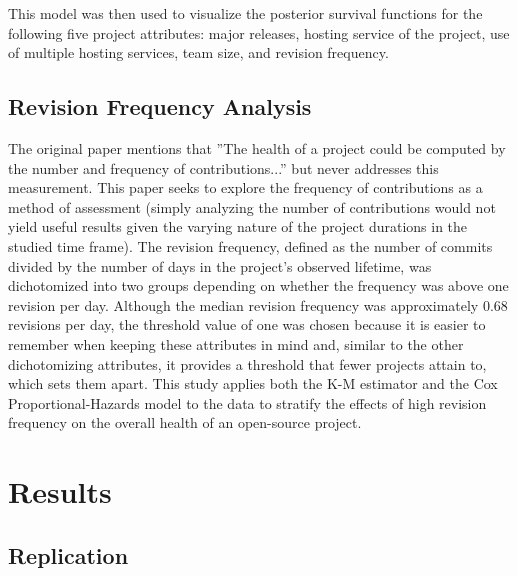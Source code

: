 \documentclass[acmconf]{acmart}
\begin{document}
This model was then used to visualize the posterior survival functions for the following five project attributes: major releases, hosting service of the project, use of multiple hosting services, team size, and revision frequency. 


\subsection{Revision Frequency Analysis} \label{revisionFreq}

The original paper mentions that ''The health of a project could be computed by the number and frequency of contributions...'' but never addresses this measurement.
This paper seeks to explore the frequency of contributions as a method of assessment (simply analyzing the number of contributions would not yield useful results given the varying nature of the project durations in the studied time frame). 
The revision frequency, defined as the number of commits divided by the number of days in the project's observed lifetime, was dichotomized into two groups depending on whether the frequency was above one revision per day.
Although the median revision frequency was approximately 0.68 revisions per day, the threshold value of one was chosen because it is easier to remember when keeping these attributes in mind and, similar to the other dichotomizing attributes, it provides a threshold that fewer projects attain to, which sets them apart.
This study applies both the K-M estimator and the Cox Proportional-Hazards model to the data to stratify the effects of high revision frequency on the overall health of an open-source project.

\section{Results} \label{results}

\subsection{Replication}
\end{document}
